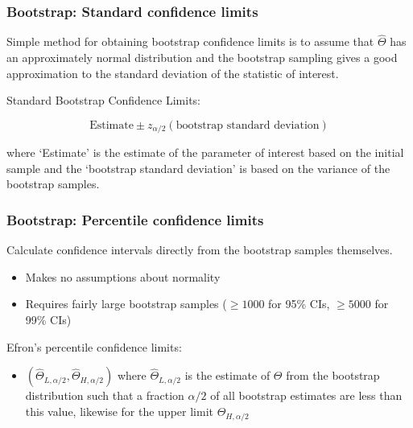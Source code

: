 \documentclass{beamer}
\begin{document}
\begin{frame}
  \frametitle{Bootstrap: Standard confidence limits}

Simple method for obtaining bootstrap confidence limits is to assume that $\widehat{\Theta}$ has an approximately normal distribution and the bootstrap sampling gives a good approximation to the standard deviation of the statistic of interest.
\medskip

Standard Bootstrap Confidence Limits:

\[
\mbox{Estimate} \pm z_{\alpha/2} (\mbox{bootstrap standard deviation})
\]

where `Estimate' is the estimate of the parameter of interest based on the initial sample and the `bootstrap standard deviation' is based on the variance of the bootstrap samples.

\end{frame}
\begin{frame}
  \frametitle{Bootstrap: Percentile confidence limits}

Calculate confidence intervals directly from the bootstrap samples themselves.

\begin{itemize}
    \item Makes no assumptions about normality
    \item Requires fairly large bootstrap samples ($\geq 1000$ for 95\% CIs, $\geq 5000$ for 99\% CIs)
\end{itemize}

Efron's percentile confidence limits:
\begin{itemize}
    \item $(\widehat{\Theta}_{L,\alpha/2}, \widehat{\Theta}_{H,\alpha/2})$ where $\widehat{\Theta}_{L,\alpha/2}$ is the estimate of $\Theta$ from the bootstrap distribution such that a fraction $\alpha/2$ of all bootstrap estimates are less than this value, likewise for the upper limit $\widehat{\Theta}_{H,\alpha/2}$
\end{itemize}


\end{frame}
\end{document}

